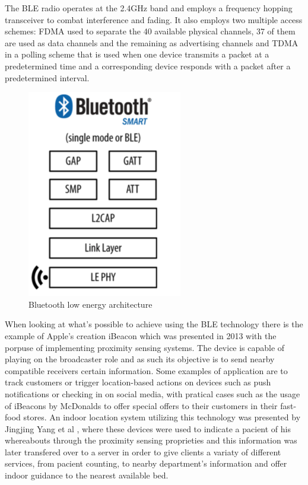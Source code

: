 \documentclass[a4paper]{IEEEtran}
\begin{document}
The BLE radio operates at the 2.4GHz band and employs a frequency hopping transceiver to combat interference and fading. It also employs two multiple access schemes: FDMA used to separate the 40 available physical channels, 37 of them are used as data channels and the remaining as advertising channels and TDMA in a polling scheme that is used when one device transmits a packet at a predetermined time and a corresponding device responds with a packet after a predetermined interval.

 \begin{figure}[htp]
	\centering
		\includegraphics[width=0.5\linewidth]{figures/BLEArchitecture.png}
	\caption[Bluetooth Low Energy Architecture]{Bluetooth low energy architecture}
	\label{fig:BLEarchitecture}
\end{figure}


When looking at what's possible to achieve using the BLE technology there is the example of Apple's creation iBeacon \cite{ibeacon} which was presented in 2013 with the porpuse of implementing proximity sensing systems. The device is capable of playing on the broadcaster role and as such its objective is to send nearby compatible receivers certain information. Some examples of application are to track customers or trigger location-based actions on devices such as push notifications or checking in on social media, with pratical cases such as the usage of iBeacons by McDonalds to offer special offers to their customers in their fast-food stores. An indoor location system utilizing this technology was presented by Jingjing Yang et al \cite{ibeacon1}, where these devices were used to indicate a pacient of his whereabouts through the proximity sensing proprieties and this information was later transfered over to a server in order to give clients a variaty of different services, from pacient counting, to nearby department's information and offer indoor guidance to the nearest available bed. 
\end{document}
